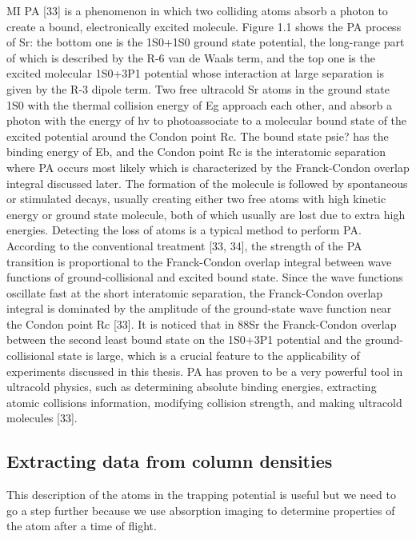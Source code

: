 MI
PA [33] is a phenomenon in which two colliding atoms absorb a photon to create a bound, electronically excited molecule. 
Figure 1.1 shows the PA process of Sr: the bottom one is the 1S0+1S0 ground state potential, the long-range part of which is described by the R-6 van de Waals term, and the top one is the excited molecular 1S0+3P1 potential whose interaction at large separation is given by the R-3 dipole term. 
Two free ultracold Sr atoms in the ground state 1S0 with the thermal collision energy of Eg approach each other, and absorb a photon with the energy of hv to photoassociate to a molecular bound state of the excited potential around the Condon point Rc. 
The bound state psie? has the binding energy of Eb, and the Condon point Rc is the interatomic separation where PA occurs most likely which is characterized by the Franck-Condon overlap integral discussed later. 
The formation of the molecule is followed by spontaneous or stimulated decays, usually creating either two free atoms with high kinetic energy or ground state molecule, both of which usually are lost due to extra high energies. 
Detecting the loss of atoms is a typical method to perform PA.
According to the conventional treatment [33, 34], the strength of the PA transition is proportional to the Franck-Condon overlap integral between wave functions of ground-collisional and excited bound state. 
Since the wave functions oscillate fast at the short interatomic separation, the Franck-Condon overlap integral is dominated by the amplitude of the ground-state wave function near the Condon point Rc [33]. 
It is noticed that in 88Sr the Franck-Condon overlap between the second least bound state on the 1S0+3P1 potential and the ground-collisional state is large, which is a crucial feature to the applicability of experiments discussed in this thesis. 
PA has proven to be a very powerful tool in ultracold physics, such as determining absolute binding energies, extracting atomic collisions information, modifying collision strength, and making ultracold molecules [33].

\subsection{Extracting data from column densities} \label{ssec:tof}

This description of the atoms in the trapping potential is useful but we need to go a step further because we use absorption imaging to determine properties of the atom after a time of flight.

